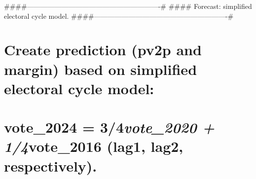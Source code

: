 \documentclass[
]{article}
\begin{document}
\#\#\#\#----------------------------------------------------------\#
\#\#\#\# Forecast: simplified electoral cycle model.
\#\#\#\#----------------------------------------------------------\#

\section{Create prediction (pv2p and margin) based on simplified
electoral cycle
model:}\label{create-prediction-pv2p-and-margin-based-on-simplified-electoral-cycle-model}

\section{\texorpdfstring{vote\_2024 = 3/4\emph{vote\_2020 +
1/4}vote\_2016 (lag1, lag2,
respectively).}{vote\_2024 = 3/4vote\_2020 + 1/4vote\_2016 (lag1, lag2, respectively).}}\label{vote_2024-34vote_2020-14vote_2016-lag1-lag2-respectively.}
\end{document}
